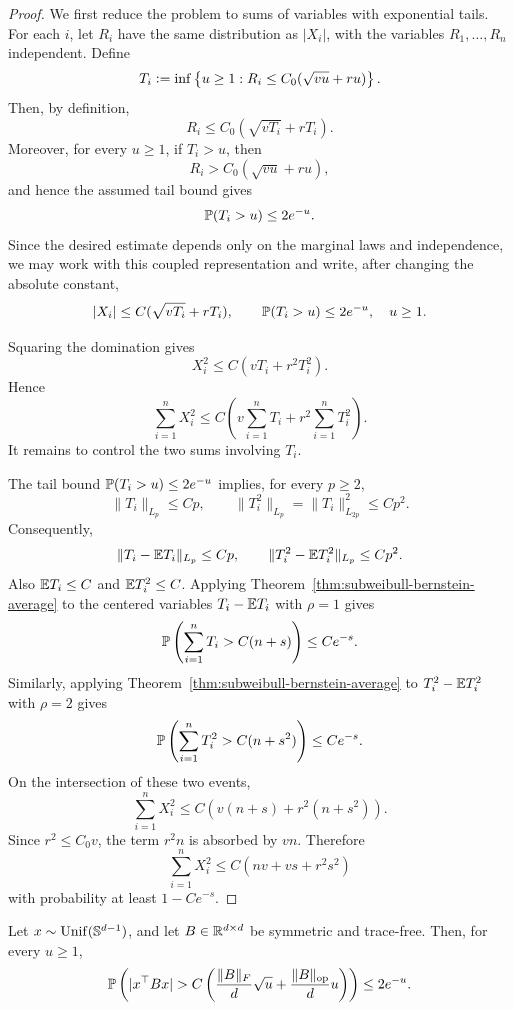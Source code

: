 \begin{proof}
We first reduce the problem to sums of variables with exponential tails. For each
\(i\), let \(R_i\) have the same distribution as \(|X_i|\), with the variables
\(R_1,\dots,R_n\) independent. Define
\[
T_i
\vcentcolon=
\inf\left\{u\ge1:
R_i\le C_0(\sqrt{vu}+ru)
\right\}.
\]
Then, by definition,
\[
R_i\le C_0(\sqrt{vT_i}+rT_i).
\]
Moreover, for every \(u\ge1\), if \(T_i>u\), then
\[
R_i>C_0(\sqrt{vu}+ru),
\]
and hence the assumed tail bound gives
\[
\mathbb{P}(T_i>u)\le 2e^{-u}.
\]
Since the desired estimate depends only on the marginal laws and independence, we may
work with this coupled representation and write, after changing the absolute constant,
\[
|X_i|
\le
C(\sqrt{vT_i}+rT_i),
\qquad
\mathbb{P}(T_i>u)\le2e^{-u},\quad u\ge1.
\]

Squaring the domination gives
\[
X_i^2
\le
C\left(vT_i+r^2T_i^2\right).
\]
Hence
\[
\sum_{i=1}^n X_i^2
\le
C\left(
 v\sum_{i=1}^nT_i+r^2\sum_{i=1}^nT_i^2
\right).
\]
It remains to control the two sums involving \(T_i\).

The tail bound \(\mathbb{P}(T_i>u)\le2e^{-u}\) implies, for every \(p\ge2\),
\[
\|T_i\|_{L_p}
\le Cp,
\qquad
\|T_i^2\|_{L_p}
=
\|T_i\|_{L_{2p}}^2
\le Cp^2.
\]
Consequently,
\[
\|T_i-\mathbb{E} T_i\|_{L_p}\le Cp,
\qquad
\|T_i^2-\mathbb{E} T_i^2\|_{L_p}\le Cp^2.
\]
Also \(\mathbb{E} T_i\le C\) and \(\mathbb{E} T_i^2\le C\). Applying
Theorem~\ref{thm:subweibull-bernstein-average} to the centered variables
\(T_i-\mathbb{E} T_i\) with \(\rho=1\) gives
\[
\mathbb{P}\left(
\sum_{i=1}^nT_i>C(n+s)
\right)
\le Ce^{-s}.
\]
Similarly, applying Theorem~\ref{thm:subweibull-bernstein-average} to
\(T_i^2-\mathbb{E} T_i^2\) with \(\rho=2\) gives
\[
\mathbb{P}\left(
\sum_{i=1}^nT_i^2>C(n+s^2)
\right)
\le Ce^{-s}.
\]
On the intersection of these two events,
\[
\sum_{i=1}^n X_i^2
\le
C\left(v(n+s)+r^2(n+s^2)\right).
\]
Since \(r^2\le C_0v\), the term \(r^2n\) is absorbed by \(vn\). Therefore
\[
\sum_{i=1}^n X_i^2
\le
C\left(nv+vs+r^2s^2\right)
\]
with probability at least \(1-Ce^{-s}\).
\end{proof}

\begin{lemma}
\label{lem:spherical-quadratic-tail}
Let \(x\sim\mathrm{Unif}(\mathbb{S}^{d-1})\), and let \(B\in\mathbb{R}^{d\times d}\) be
symmetric and trace-free. Then, for every \(u\ge1\),
\[
\mathbb{P}\left(
|x^\top Bx|
>
C\left(
\frac{\|B\|_F}{d}\sqrt u+
\frac{\|B\|_{\mathrm{op}}}{d}u
\right)
\right)
\le
2e^{-u}.
\]
\end{lemma}

